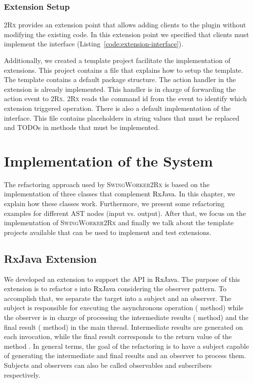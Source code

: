 \documentclass[type=bsc,accentcolor=tud9c]{tudthesis}
\newcommand{\framework}[1]{\textcolor{black}{#1}}
\newcommand{\toolcore}{\textsc{2Rx}}
\newcommand{\toolextension}{\textsc{SwingWorker2Rx}}
\begin{document}
\subsection{Extension Setup}
\toolcore{} provides an extension point that allows adding clients to the plugin without modifying the existing code. In this extension point we specified that clients must implement the interface  (Listing~\ref{code:extension-interface}).



Additionally, we created a template project facilitate the implementation of extensions. This project contains a  file that explains how to setup the template. The template contains a default package structure. The action handler in the extension is already implemented. This handler is in charge of forwarding the action event to \toolcore{}. \toolcore{} reads the command id from the event to identify which extension triggered operation. There is also a default implementation of the  interface. This file contains placeholders in string values that must be replaced and TODOs in methods that must be implemented.

\chapter{Implementation of the System}
\label{chapter:implementation}
The refactoring approach used by \toolextension{} is based on the implementation of three classes that complement \framework{RxJava}. In this chapter, we explain how these classes work. Furthermore, we present some refactoring examples for different AST nodes (input vs. output). After that, we focus on the implementation of \toolextension{} and finally we talk about the template projects available that can be used to implement and test extensions.

\section{RxJava Extension}

We developed an extension to support the  API in \framework{RxJava}. The purpose of this extension is to refactor s into \framework{RxJava} considering the observer pattern. To accomplish that, we separate the target  into a subject and an observer. The subject is responsible for executing the asynchronous operation ( method) while the observer is in charge of processing the intermediate results ( method) and the final result ( method) in the main thread. Intermediate results are generated on each  invocation, while the final result corresponds to the return value of the method . In general terms, the goal of the refactoring is to have a subject capable of generating the intermediate and final results and an observer to process them. Subjects and observers can also be called observables and subscribers respectively.
\end{document}
